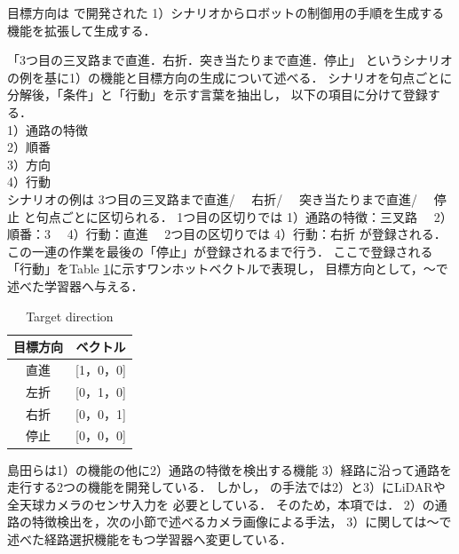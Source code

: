 \documentclass{sice-si}
\begin{document}
目標方向は\cite{shimada2020}
で開発された
1）シナリオからロボットの制御用の手順を生成する機能を拡張して生成する．
\par
「3つ目の三叉路まで直進．右折．突き当たりまで直進．停止」
というシナリオの例を基に1）の機能と目標方向の生成について述べる．
シナリオを句点ごとに分解後，「条件」と「行動」を示す言葉を抽出し，
以下の項目に分けて登録する．\\
1）通路の特徴\\
2）順番\\
3）方向\\
4）行動\\
シナリオの例は
3つ目の三叉路まで直進/　
右折/　
突き当たりまで直進/　
停止
と句点ごとに区切られる．
1つ目の区切りでは
1）通路の特徴：三叉路　
2）順番：3　
4）行動：直進　
2つ目の区切りでは
4）行動：右折
が登録される．
この一連の作業を最後の「停止」が登録されるまで行う．
ここで登録される「行動」をTable \ref{tab:target}に示すワンホットベクトルで表現し，
目標方向として，〜で述べた学習器へ与える．

\begin{table}[]
    \centering
    \caption{Target direction}\label{tab:target}
    \begin{tabular}{cc}
    \hline
    目標方向 & ベクトル        \\
    \hline
    直進   & {[}1，0，0{]} \\
    左折   & {[}0，1，0{]} \\
    右折   & {[}0，0，1{]} \\
    停止   & {[}0，0，0{]}\\
    \hline
    \end{tabular}
    \end{table}

\par
島田らは1）の機能の他に2）通路の特徴を検出する機能
3）経路に沿って通路を走行する2つの機能を開発している．
しかし，\cite{shimada2020}\cite{hara2022}
の手法では2）と3）にLiDARや全天球カメラのセンサ入力を
必要としている．
そのため，本項では．
2）の通路の特徴検出を，次の小節で述べるカメラ画像による手法，
3）に関しては〜で述べた経路選択機能をもつ学習器へ変更している．
\end{document}
